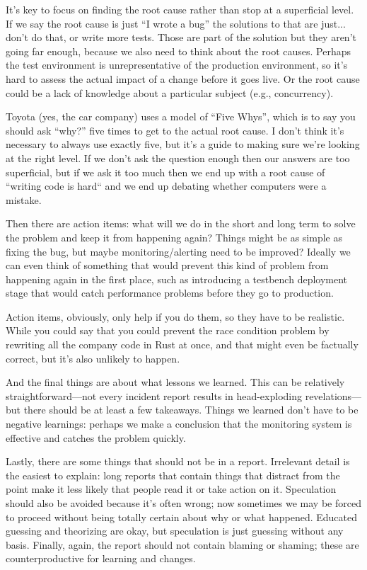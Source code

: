 It's key to focus on finding the root cause rather than stop at a superficial level. If we say the root cause is just ``I wrote a bug'' the solutions to that are just... don't do that, or write more tests. Those are part of the solution but they aren't going far enough, because we also need to think about the root causes. Perhaps the test environment is unrepresentative of the production environment, so it's hard to assess the actual impact of a change before it goes live. Or the root cause could be a lack of knowledge about a particular subject (e.g., concurrency). 

Toyota (yes, the car company) uses a model of ``Five Whys'', which is to say you should ask ``why?'' five times to get to the actual root cause. I don't think it's necessary to always use exactly five, but it's a guide to making sure we're looking at the right level. If we don't ask the question enough then our answers are too superficial, but if we ask it too much then we end up with a root cause of ``writing code is hard`` and we end up debating whether computers were a mistake.

Then there are action items: what will we do in the short and long term to solve the problem and keep it from happening again? Things might be as simple as fixing the bug, but maybe monitoring/alerting need to be improved? Ideally we can even think of something that would prevent this kind of problem from happening again in the first place, such as introducing a testbench deployment stage that would catch performance problems before they go to production. 

Action items, obviously, only help if you do them, so they have to be realistic. While you could say that you could prevent the race condition problem by rewriting all the company code in Rust at once, and that might even be factually correct, but it's also unlikely to happen.

And the final things are about what lessons we learned. This can be relatively straightforward---not every incident report results in head-exploding revelations---but there should be at least a few takeaways. Things we learned don't have to be negative learnings: perhaps we make a conclusion that the monitoring system is effective and catches the problem quickly. 

Lastly, there are some things that should not be in a report. Irrelevant detail is the easiest to explain: long reports that contain things that distract from the point make it less likely that people read it or take action on it. Speculation should also be avoided because it's often wrong; now sometimes we may be forced to proceed without being totally certain about why or what happened. Educated guessing and theorizing are okay, but speculation is just guessing without any basis. Finally, again, the report should not contain blaming or shaming; these are counterproductive for learning and changes. 

